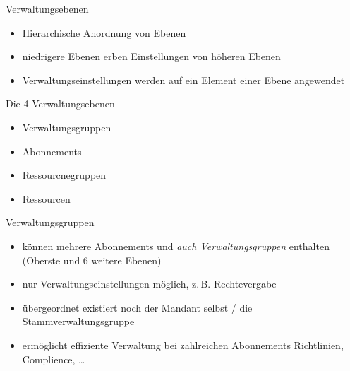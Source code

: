 
\begin{flashcard}[Definition]{Verwaltungsebenen}
  \begin{itemize}
    \item Hierarchische Anordnung von Ebenen
    \item niedrigere Ebenen erben Einstellungen von höheren Ebenen
    \item Verwaltungseinstellungen werden auf ein Element einer Ebene angewendet
  \end{itemize}
\end{flashcard}

\begin{flashcard}[Definition]{Die 4 Verwaltungsebenen}
  \begin{itemize}
    \item Verwaltungsgruppen
    \item Abonnements
    \item Ressourcnegruppen
    \item Ressourcen
  \end{itemize}
\end{flashcard}

\begin{flashcard}[Definition]{Verwaltungsgruppen}
  \begin{itemize}
    \item können mehrere Abonnements und \emph{auch Verwaltungsgruppen} enthalten\newline
      (Oberste und 6 weitere Ebenen)
    \item nur Verwaltungseinstellungen möglich, z.\,B. Rechtevergabe
    \item übergeordnet existiert noch der Mandant selbst / die Stammverwaltungsgruppe
    \item ermöglicht effiziente Verwaltung bei zahlreichen Abonnements\newline
      Richtlinien, Complience, \ldots
  \end{itemize}
\end{flashcard}

